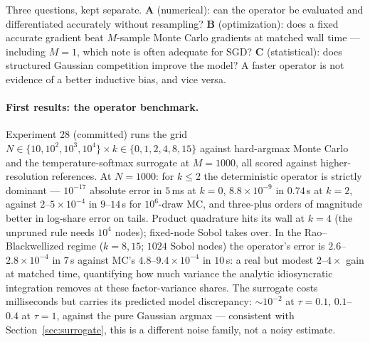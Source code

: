 \documentclass[11pt]{article}
\theoremstyle{remark}
\begin{document}
Three questions, kept separate. \textbf{A} (numerical): can the
operator be evaluated and differentiated accurately without
resampling? \textbf{B} (optimization): does a fixed accurate gradient
beat $M$-sample Monte Carlo gradients at matched wall time --- including
$M = 1$, which \citet{berthet2020} note is often adequate for SGD?
\textbf{C} (statistical): does structured Gaussian competition improve
the model? A faster operator is not evidence of a better inductive
bias, and vice versa.

\paragraph{First results: the operator benchmark.} Experiment 28
(committed) runs the grid $N \in \{10, 10^2, 10^3, 10^4\} \times k \in
\{0, 1, 2, 4, 8, 15\}$ against hard-argmax Monte Carlo and the
temperature-softmax surrogate at $M = 1000$, all scored against
higher-resolution references. At $N = 1000$: for $k \le 2$ the
deterministic operator is strictly dominant --- $10^{-17}$ absolute
error in $5$\,ms at $k=0$, $8.8\times10^{-9}$ in $0.74$\,s at $k=2$,
against $2$--$5\times10^{-4}$ in $9$--$14$\,s for $10^6$-draw MC, and
three-plus orders of magnitude better in log-share error on tails.
Product quadrature hits its wall at $k = 4$ (the unpruned rule needs
$10^4$ nodes); fixed-node Sobol takes over. In the Rao--Blackwellized
regime ($k = 8, 15$; $1024$ Sobol nodes) the operator's error is
$2.6$--$2.8\times10^{-4}$ in $7$\,s against MC's
$4.8$--$9.4\times10^{-4}$ in $10$\,s: a real but modest $2$--$4\times$
gain at matched time, quantifying how much variance the analytic
idiosyncratic integration removes at these factor-variance shares. The
surrogate costs milliseconds but carries its predicted model
discrepancy: $\sim10^{-2}$ at $\tau = 0.1$, $0.1$--$0.4$ at $\tau = 1$,
against the pure Gaussian argmax --- consistent with
Section~\ref{sec:surrogate}, this is a different noise family, not a
noisy estimate.
\end{document}
